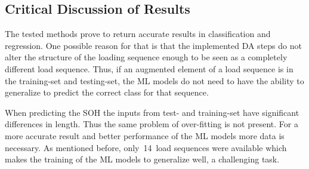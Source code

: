\subsection{Critical Discussion of Results}

The tested methods prove to return accurate results in classification and regression. One possible reason for that is that the implemented DA steps do not alter the structure of the loading sequence enough to be seen as a completely different load sequence. Thus, if an augmented element of a load sequence is in the training-set and testing-set, the ML models do not need to have the ability to generalize to predict the correct class for that sequence. 

When predicting the SOH the inputs from test- and training-set have significant differences in length. Thus the same problem of over-fitting is not present. For a more accurate result and better performance of the ML models more data is necessary. As mentioned before, only~14~load sequences were available which makes the training of the ML models to generalize well, a challenging task.   

\afterpage{\null\newpage}